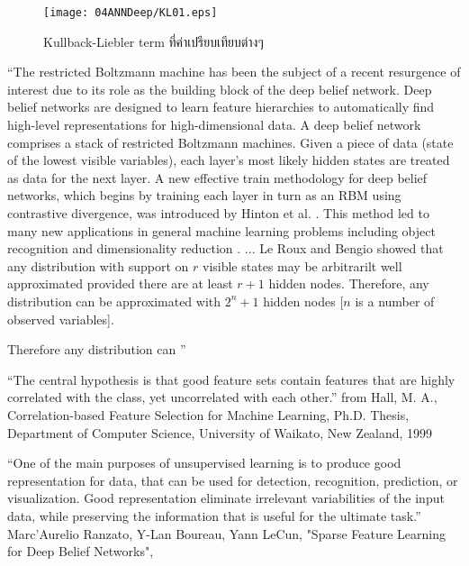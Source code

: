 %
\begin{figure}
\begin{center}
\texttt{[image: 04ANNDeep/KL01.eps]}
\end{center}
\caption{Kullback-Liebler term ที่ค่าเปรียบเทียบต่างๆ}
\label{fig: deep KL characteristics}
\end{figure}
%



``The restricted Boltzmann machine has been the subject of a recent resurgence of interest due to its role as the building block of the deep belief network. Deep belief networks are designed to learn feature hierarchies to automatically find high-level representations for high-dimensional data. A deep belief network comprises a stack of restricted Boltzmann machines. Given a piece of data (state of the lowest visible variables), each layer's most likely hidden states are treated as data for the next layer. A new effective train methodology for deep belief networks, which begins by training each layer in turn as an RBM using contrastive divergence, was introduced by Hinton et al. \cite{HintonEtAl2006a}. This method led to many new applications in general machine learning problems including object recognition and dimensionality reduction \cite{HintonSalakhutdinov2006a}. ... 
Le Roux and Bengio \cite{LeRouxBengio2008a} showed that any distribution with support on $r$ visible states may be arbitrarilt well approximated provided there are at least $r+1$ hidden nodes.
Therefore, any distribution can be approximated with $2^n + 1$ hidden nodes [$n$ is a number of observed variables].

Therefore any distribution can  '' \cite{CuetoEtAl2009a}

``The central hypothesis is that good feature sets contain features that are highly correlated
with the class, yet uncorrelated with each other.'' from Hall, M. A., Correlation-based Feature Selection for Machine Learning, Ph.D. Thesis, Department of Computer Science, University of Waikato, New Zealand, 1999


``One of the main purposes of unsupervised learning is to produce good representation for data, that can be used for detection, recognition, prediction, or visualization. Good representation eliminate irrelevant variabilities of the input data, while preserving the information that is useful for the ultimate task.''
Marc'Aurelio Ranzato, Y-Lan Boureau, Yann LeCun, "Sparse Feature Learning for Deep Belief Networks", 